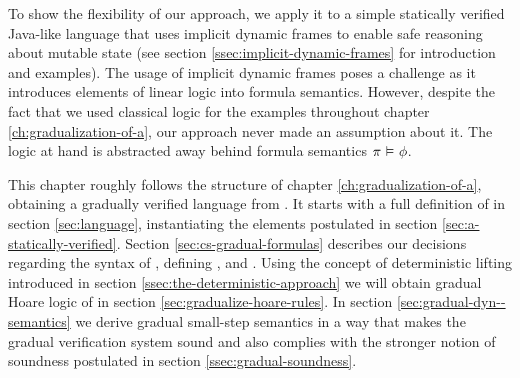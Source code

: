 To show the flexibility of our approach, we apply it to a simple statically verified Java-like language \svlidf that uses implicit dynamic frames to enable safe reasoning about mutable state (see section \ref{ssec:implicit-dynamic-frames} for introduction and examples).
The usage of implicit dynamic frames poses a challenge as it introduces elements of linear logic into formula semantics.
However, despite the fact that we used classical logic for the examples throughout chapter \ref{ch:gradualization-of-a}, our approach never made an assumption about it.
The logic at hand is abstracted away behind formula semantics $\pi \,\,{\vDash}\,\, \phi$.

This chapter roughly follows the structure of chapter \ref{ch:gradualization-of-a}, obtaining a gradually verified language \gvlidf from \svlidf.
It starts with a full definition of \svlidf in section \ref{sec:language}, instantiating the elements postulated in section \ref{sec:a-statically-verified}.
Section \ref{sec:cs-gradual-formulas} describes our decisions regarding the syntax of \gvlidf, defining \setGFormula, \setGStmt and \setGProgramState.
Using the concept of deterministic lifting introduced in section \ref{ssec:the-deterministic-approach} we will obtain gradual Hoare logic of \gvlidf in section \ref{sec:gradualize-hoare-rules}.
In section \ref{sec:gradual-dyn--semantics} we derive gradual small-step semantics in a way that makes the gradual verification system sound and also complies with the stronger notion of soundness postulated in section \ref{ssec:gradual-soundness}.